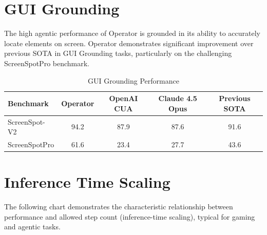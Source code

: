 \documentclass[11pt, a4paper]{article}
\newcommand{\modelname}{Operator}
\newcommand{\claude}{Claude 4.5 Opus}
\begin{document}
\section{GUI Grounding}
The high agentic performance of \modelname{} is grounded in its ability to accurately locate elements on screen. \modelname{} demonstrates significant improvement over previous SOTA in GUI Grounding tasks, particularly on the challenging ScreenSpotPro benchmark.

\begin{table}[H]
    \centering
    \caption{GUI Grounding Performance}
    \begin{tabular}{lcccc}
        \toprule
        \textbf{Benchmark} & \textbf{\modelname} & \textbf{OpenAI CUA} & \textbf{\claude} & \textbf{Previous SOTA} \\
        \midrule
        ScreenSpot-V2 & 94.2 & 87.9 & 87.6 & 91.6 \\
        ScreenSpotPro & 61.6 & 23.4 & 27.7 & 43.6 \\
        \bottomrule
    \end{tabular}
\end{table}

\section{Inference Time Scaling}
The following chart demonstrates the characteristic relationship between performance and allowed step count (inference-time scaling), typical for gaming and agentic tasks.
\end{document}
